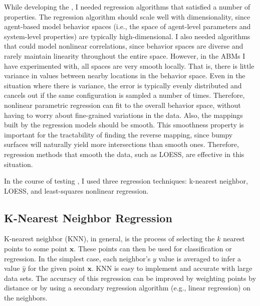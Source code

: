 While developing the \framework, I needed regression algorithms that satisfied a number of properties.
The regression algorithm should scale well with dimensionality, since agent-based model behavior spaces (i.e., the space of agent-level parameters and system-level properties) are typically high-dimensional.
I also needed algorithms that could model nonlinear correlations, since behavior spaces are diverse and rarely maintain linearity throughout the entire space.
However, in the ABMs I have experimented with, all spaces are very smooth locally.
That is, there is little variance in values between nearby locations in the behavior space.
Even in the situation where there is variance, the error is typically evenly distributed and cancels out if the same configuration is sampled a number of times.
Therefore, nonlinear parametric regression can fit to the overall behavior space, without having to worry about fine-grained variations in the data.
Also, the mappings built by the regression models should be smooth.
This smoothness property is important for the tractability of finding the reverse mapping, since bumpy surfaces will naturally yield more intersections than smooth ones.
Therefore, regression methods that smooth the data, such as LOESS, are effective in this situation.

In the course of testing \fw, I used three regression techniques: k-nearest neighbor, LOESS, and least-squares nonlinear regression.

\subsection{K-Nearest Neighbor Regression}
K-nearest neighbor (KNN), in general, is the process of selecting the $k$ nearest points to some point $\mathbf x$.
These points can then be used for classification or regression.
In the simplest case, each neighbor's $y$ value is averaged to infer a value $\hat y$ for the given point $\mathbf x$.
KNN is easy to implement and accurate with large data sets.
The accuracy of this regression can be improved by weighting points by distance or by using a secondary regression algorithm (e.g., linear regression) on the neighbors.


